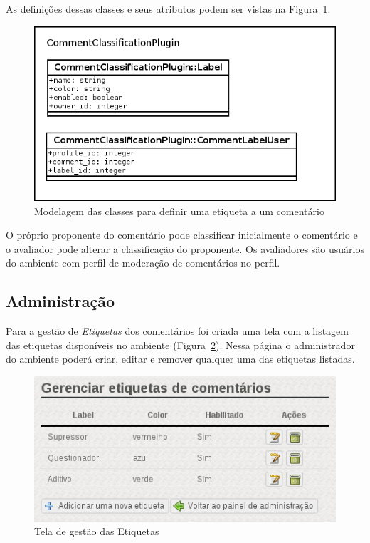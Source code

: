 \documentclass[11pt]{article}
\begin{document}
As definições dessas classes e seus atributos podem ser vistas na
Figura~\ref{fig:labels-model}.

\begin{figure}[h]
\center
\includegraphics[scale=0.6]{labels-model.png}
\caption{Modelagem das classes para definir uma etiqueta a um comentário}
\label{fig:labels-model}
\end{figure}

O próprio proponente do comentário pode classificar inicialmente o
comentário e o avaliador pode alterar a classificação do proponente. Os
avaliadores são usuários do ambiente com perfil de moderação de
comentários no perfil.

\subsection{Administração}

Para a gestão de {\it Etiquetas} dos comentários foi criada uma tela com
a listagem das etiquetas disponíveis no ambiente
(Figura~\ref{fig:plugin-label-admin}). Nessa página o administrador
do ambiente poderá criar, editar e remover qualquer uma das etiquetas
listadas.

\begin{figure}[h]
\center
\includegraphics[scale=0.9]{plugin-label-admin.png}
\caption{Tela de gestão das Etiquetas}
\label{fig:plugin-label-admin}
\end{figure}
\end{document}
